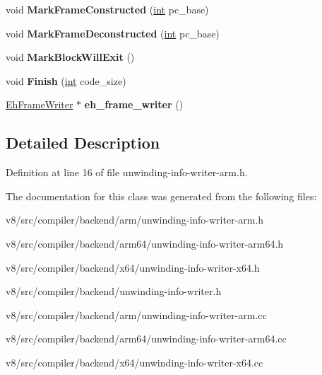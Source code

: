 \begin{DoxyCompactItemize}
void {\bfseries Mark\+Frame\+Constructed} (\mbox{\hyperlink{classint}{int}} pc\+\_\+base)
\item 
\mbox{\label{classv8_1_1internal_1_1compiler_1_1UnwindingInfoWriter_acb2a88eb365e90796c3e70f6873e3e36}} 
void {\bfseries Mark\+Frame\+Deconstructed} (\mbox{\hyperlink{classint}{int}} pc\+\_\+base)
\item 
\mbox{\label{classv8_1_1internal_1_1compiler_1_1UnwindingInfoWriter_a159ca354dbbdeb7a838b58ed2e2fdbc7}} 
void {\bfseries Mark\+Block\+Will\+Exit} ()
\item 
\mbox{\label{classv8_1_1internal_1_1compiler_1_1UnwindingInfoWriter_a7dd0336aa10a53ee8dd31c57179c9778}} 
void {\bfseries Finish} (\mbox{\hyperlink{classint}{int}} code\+\_\+size)
\item 
\mbox{\label{classv8_1_1internal_1_1compiler_1_1UnwindingInfoWriter_ae8d9ca300ce739150b15da003ce3e642}} 
\mbox{\hyperlink{classv8_1_1internal_1_1EhFrameWriter}{Eh\+Frame\+Writer}} $\ast$ {\bfseries eh\+\_\+frame\+\_\+writer} ()
\end{DoxyCompactItemize}


\subsection{Detailed Description}


Definition at line 16 of file unwinding-\/info-\/writer-\/arm.\+h.



The documentation for this class was generated from the following files\+:\begin{DoxyCompactItemize}
\item 
v8/src/compiler/backend/arm/unwinding-\/info-\/writer-\/arm.\+h\item 
v8/src/compiler/backend/arm64/unwinding-\/info-\/writer-\/arm64.\+h\item 
v8/src/compiler/backend/x64/unwinding-\/info-\/writer-\/x64.\+h\item 
v8/src/compiler/backend/unwinding-\/info-\/writer.\+h\item 
v8/src/compiler/backend/arm/unwinding-\/info-\/writer-\/arm.\+cc\item 
v8/src/compiler/backend/arm64/unwinding-\/info-\/writer-\/arm64.\+cc\item 
v8/src/compiler/backend/x64/unwinding-\/info-\/writer-\/x64.\+cc\end{DoxyCompactItemize}
